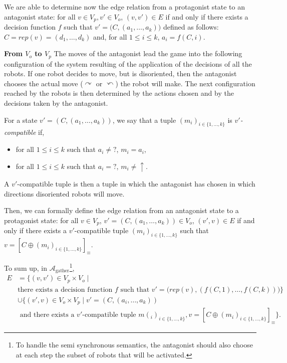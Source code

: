 \documentclass[envcountsame]{llncs} \usepackage[english]{babel}
\newcommand{\arena}{\ensuremath{\mathcal{A}}}
\newcommand{\equivclass}[1]{[#1]_\equiv}
\newcommand{\Agather}{\ensuremath{\arena_{\textrm{gather}}}}
\newcommand{\rep}{\ensuremath{\mathit{rep}}}
\newcommand{\clockwise}{\ensuremath{\curvearrowright}}
\newcommand{\counterclockwise}{\ensuremath{\curvearrowleft}}
\newcommand{\still}{\ensuremath{\uparrow}}
\newcommand{\disoriented}{?}
\begin{document}
We are able to determine now the edge relation from a protagonist state to an antagonist
state: for all $v\in V_p, v'\in V_o$, 
$(v,v')\in E$ { if and only if there exists a decision function $f$ such that }$v'=\bigl (C,(a_1,\dots,a_k)\bigr )$ defined as follows:
$C=\rep(v)=(d_1,\dots,d_k)$ and, for all $1\leq i\leq k$, $a_i=f(C,i)$.
\medskip

\textbf{From $V_o$ to $V_p$}
The moves of the antagonist lead the game into the following configuration of the system resulting of the application
of the decisions of all the robots. 
If one robot decides to move, but is disoriented, then the antagonist chooses the actual move (\clockwise{} or 
\counterclockwise) the robot will make. The next configuration reached by the robots is then determined
by the actions chosen and by the decisions taken by the antagonist.

\begin{definition}\label{def:v'-comp}
For a state $v'=(C, (a_1,\dots, a_k))$, we say that a tuple $(m_i)_{i\in\{1,\dots,k\}}$ is \emph{$v'$-compatible} if, 
\begin{itemize}
\item for all $1\leq i\leq k$ such that $a_i\neq\disoriented$, $m_i=a_i$,
\item for all $1\leq i\leq k$ such that $a_i=\disoriented$, $m_i\neq\still$.
\end{itemize}
\end{definition}

A $v'$-compatible tuple is then a tuple in which the antagonist has chosen in which directions disoriented robots 
will move.

Then, we can formally define the edge relation from an antagonist state to a protagonist state: for all $v\in V_p$, $v'=(C,(a_1,\dots,a_k))\in V_o$,
$(v',v)\in E$ if and only if there exists a $v'$-compatible tuple $(m_i)_{i\in\{1,\dots,k\}}$ such that $v=\equivclass{C\oplus (m_i)_{i\in\{1,\dots,k\}}}$.

To sum up, in $\Agather$\footnote{To handle the semi synchronous semantics, the antagonist should also choose at each step the subset of robots
that will be activated.}, 
\begin{align*}
E&=\{(v,v')\in V_p\times V_o\mid \\
&\textrm{there exists a decision function $f$ such that } v'=\bigl (\rep(v),(f(C,1),\dots,f(C,k))\bigr )\}\\
&\cup \{(v',v)\in V_o\times V_p\mid v'=(C,(a_i,\dots,a_k))\\
&\textrm{ and there exists a $v'$-compatible tuple $m(_i)_{i\in\{1,\dots,k\}}$},
v=\equivclass{C\oplus (m_i)_{i\in\{1,\dots,k\}}}\}.
\end{align*}
\end{document}
